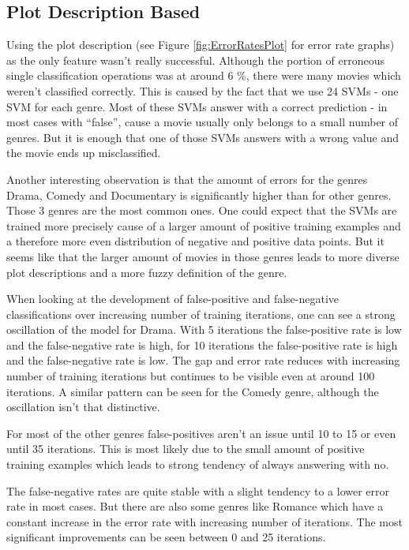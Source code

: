 \documentclass{vldb}
\begin{document}
\subsection{Plot Description Based}
\par Using the plot description (see Figure \ref{fig:ErrorRatesPlot} for error rate graphs) as the only feature wasn't really successful. Although the portion of erroneous single classification operations was at around 6 \%, there were many movies which weren't classified correctly. This is caused by the fact that we use 24 SVMs - one SVM for each genre. Most of these SVMs answer with a correct prediction - in most cases with “false”, cause a movie usually only belongs to a small number of genres. But it is enough that one of those SVMs answers with a wrong value and the movie ends up misclassified.
\par Another interesting observation is that the amount of errors for the genres Drama, Comedy and Documentary is significantly higher than for other genres. Those 3 genres are the most common ones. One could expect that the SVMs are trained more precisely cause of a larger amount of positive training examples and a therefore more even distribution of negative and positive data points. But it seems like that the larger amount of movies in those genres leads to more diverse plot descriptions and a more fuzzy definition of the genre.
\par When looking at the development of false-positive and false-negative classifications over increasing number of training iterations, one can see a strong oscillation of the model for Drama. With 5 iterations the false-positive rate is low and the false-negative rate is high, for 10 iterations the false-positive rate is high and the false-negative rate is low. The gap and error rate reduces with increasing number of training iterations but continues to be visible even at around 100 iterations. A similar pattern can be seen for the Comedy genre, although the oscillation isn't that distinctive.
\par For most of the other genres false-positives aren't an issue until 10 to 15 or even until 35 iterations. This is most likely due to the small amount of positive training examples which leads to strong tendency of always answering with no.
\par The false-negative rates are quite stable with a slight tendency to a lower error rate in most cases. But there are also some genres like Romance which have a constant increase in the error rate with increasing number of iterations. The most significant improvements can be seen between 0 and 25 iterations.
\end{document}

